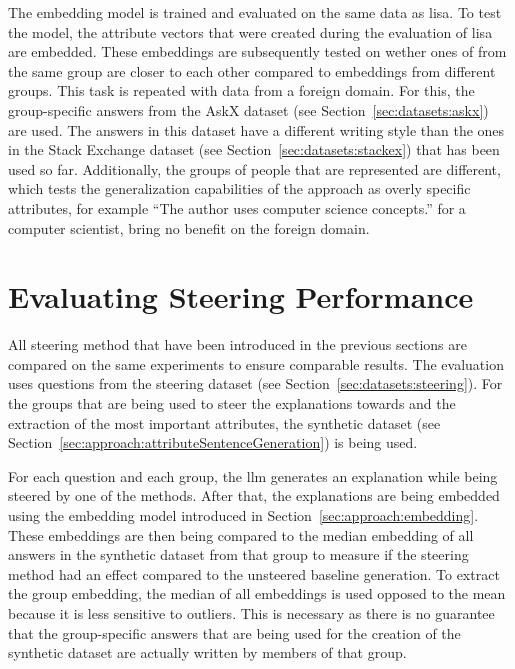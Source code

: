 The embedding model is trained and evaluated on the same data as \ac{lisa}. To test the model, the attribute vectors that were created during the evaluation of \ac{lisa} are embedded. These embeddings are subsequently tested on wether ones of from the same group are closer to each other compared to embeddings from different groups. %
This task is repeated with data from a foreign domain. For this, the group-specific answers from the AskX %
dataset (see Section~\ref{sec:datasets:askx}) are used. The answers in this dataset have a different writing style than the ones in the Stack Exchange dataset (see Section~\ref{sec:datasets:stackex}) that has been used so far. Additionally, the groups of people that are represented are different, which tests the generalization capabilities of the approach as overly specific attributes, for example \enquote{The author uses computer science concepts.} for a computer scientist, bring no benefit on the foreign domain.

\section{Evaluating Steering Performance}
\label{sec:experiments:steering}
All steering method that have been introduced in the previous sections are compared on the same experiments to ensure comparable results. The evaluation uses questions from the steering dataset (see Section~\ref{sec:datasets:steering}). For the groups that are being used to steer the explanations towards and the extraction of the most important attributes, the synthetic dataset (see Section~\ref{sec:approach:attributeSentenceGeneration}) is being used.

For each question and each group, the \ac{llm} generates an explanation while being steered by one of the methods. After that, the explanations are being embedded using the embedding model introduced in Section~\ref{sec:approach:embedding}. These embeddings are then being compared to the median embedding of all answers in the synthetic dataset from that group to measure if the steering method had an effect compared to the unsteered baseline generation.
To extract the group embedding, the median of all embeddings is used opposed to the mean because it is less sensitive to outliers. This is necessary as there is no guarantee that the group-specific answers that are being used for the creation of the synthetic dataset are actually written by members of that group.


